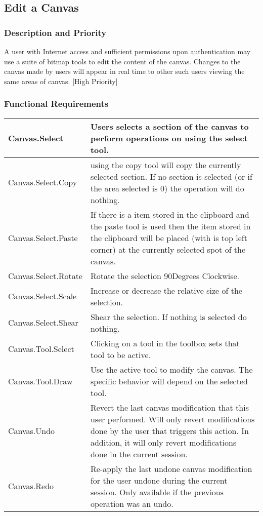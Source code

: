 \documentclass[11pt,oneside,a4paper]{article}
\begin{document}
\subsection{Edit a Canvas}
\subsubsection{Description and Priority}
	A user with Internet access and sufficient permissions upon authentication may use a suite of bitmap tools to edit the content of the canvas. Changes to the canvas made by users will appear in real time to other such users viewing the same areas of canvas.
[High Priority]
\subsubsection{Functional Requirements}

\begin{center}
\begin{tabular}{ | p{6cm} | p{6cm} | }
\hline
\tiny{Canvas.Select}		& \tiny{Users selects a section of the canvas to perform operations on using the select tool.  } \\
\hline
\tiny{Canvas.Select.Copy}	& \tiny{using the copy tool will copy the currently selected section.  If no section is selected (or if the area selected is 0) the operation will do nothing.} \\
\hline
\tiny{Canvas.Select.Paste}	& \tiny{If there is a item stored in the clipboard and the paste tool is used then the item stored in the clipboard will be placed (with is top left corner) at the currently selected spot of the canvas.  } \\
\hline
\tiny{Canvas.Select.Rotate}	& \tiny{Rotate the selection 90Degrees Clockwise.} \\
\hline
\tiny{Canvas.Select.Scale}	& \tiny{Increase or decrease the relative size of the selection.} \\
\hline
\tiny{Canvas.Select.Shear}	& \tiny{Shear the selection. If nothing is selected do nothing.} \\
\hline
\tiny{Canvas.Tool.Select}	& \tiny{Clicking on a tool in the toolbox sets that tool to be active.} \\
\hline
\tiny{Canvas.Tool.Draw}		& \tiny{Use the active tool to modify the canvas. The specific behavior will depend on the selected tool.} \\
\hline
\tiny{Canvas.Undo}		& \tiny{Revert the last canvas modification that this user performed. Will only revert modifications done by the user that triggers this action. In addition, it will only revert modifications done in the current session.} \\
\hline
\tiny{Canvas.Redo}		& \tiny{Re-apply the last undone canvas modification for the user undone during the current session. Only available if the previous operation was an undo.} \\
\hline
\end{tabular}
\end{center}
\end{document}
